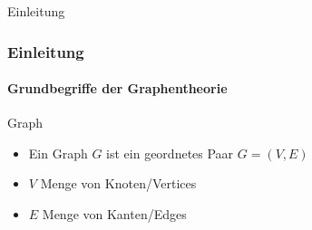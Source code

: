 \begin{frame}
    \Huge Einleitung
\end{frame}
\begin{frame}
    \frametitle{Einleitung}
    \framesubtitle{Grundbegriffe der Graphentheorie}
    \begin{KITexampleblock}{Graph}
\begin{itemize}
    \item Ein Graph $G$ ist ein geordnetes Paar $G = (V, E)$
    \item $V$ Menge von Knoten/Vertices
    \item $E$ Menge von Kanten/Edges
\end{itemize}
    \end{KITexampleblock}
\end{frame}

